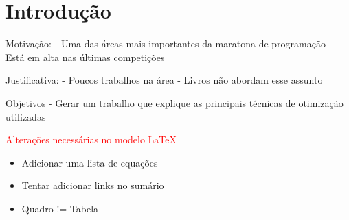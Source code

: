 \chapter{Introdu\c{c}\~ao}
\label{chap:introducao}

Motivação:
- Uma das áreas mais importantes da maratona de programação
- Está em alta nas últimas competições


Justificativa:
- Poucos trabalhos  na área
- Livros não abordam esse assunto


Objetivos
- Gerar um trabalho que explique as principais técnicas de otimização utilizadas


\textcolor{red}{Alterações necessárias no modelo \LaTeX}

\begin{itemize}
	\item Adicionar uma lista de equações
	\item Tentar adicionar links no sumário
	\item Quadro != Tabela
\end{itemize}